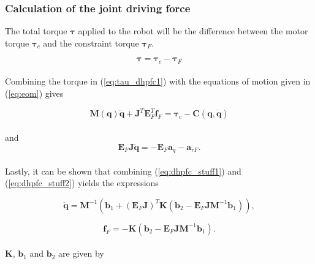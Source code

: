 
\subsubsection{Calculation of the joint driving force}

The total torque $\boldsymbol{\tau}$ applied to the robot will be the difference between the motor torque $\boldsymbol{\tau}_c$ and the constraint torque $\boldsymbol{\tau}_F$.

\begin{equation}\label{eq:tau_dhpfc1}
    \boldsymbol{\tau} = \boldsymbol{\tau}_c - \boldsymbol{\tau}_F
\end{equation}
\\

Combining the torque in (\ref{eq:tau_dhpfc1}) with the equations of motion given in (\ref{eq:eom}) gives

\begin{equation}\label{eq:dhpfc_stuff1}
    \mathbf{M(q) \ddot{q}} + \mathbf{J}^T \mathbf{E}^T_F \mathbf{f}_F = \boldsymbol{\tau}_c - \mathbf{C(q, \dot{q})}
\end{equation}
\\
and
\begin{equation}\label{eq:dhpfc_stuff2}
    \mathbf{E}_F \mathbf{J\ddot{q}} = - \mathbf{E}_F \mathbf{a}_q - \mathbf{a}_{rF}.
\end{equation}
\\
Lastly, it can be shown that combining (\ref{eq:dhpfc_stuff1}) and (\ref{eq:dhpfc_stuff2}) yields the expressions

\begin{equation}
    \mathbf{\ddot{q}} = \mathbf{M}^{-1}(\mathbf{b}_1 + (\mathbf{E}_F \mathbf{J})^T \mathbf{K} (\mathbf{b}_2 - \mathbf{E}_F \mathbf{J} \mathbf{M}^{-1} \mathbf{b}_1)),
\end{equation}

\begin{equation}
    \mathbf{f}_F = -\mathbf{K} (\mathbf{b}_2 - \mathbf{E}_F \mathbf{J} \mathbf{M}^{-1} \mathbf{b}_1).
\end{equation}
\\
$\mathbf{K}$, $\mathbf{b}_1$ and $\mathbf{b}_2$ are given by

